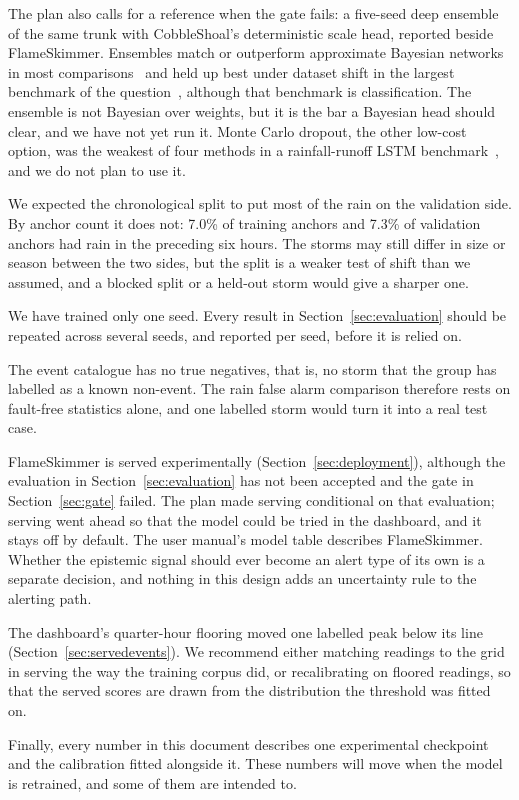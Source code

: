 \documentclass{article}
\begin{document}
The plan also calls for a reference when the gate fails: a five-seed deep
ensemble of the same trunk with CobbleShoal's deterministic scale head,
reported beside FlameSkimmer. Ensembles match or outperform approximate
Bayesian networks in most comparisons~\citep{lakshminarayanan2017ensembles}
and held up best under dataset shift in the largest benchmark of the
question~\citep{ovadia2019shift}, although that benchmark is classification.
The ensemble is not Bayesian over weights, but it is the bar a Bayesian head
should clear, and we have not yet run it. Monte Carlo dropout, the other
low-cost option, was the weakest of four methods in a rainfall-runoff LSTM
benchmark~\citep{klotz2022rainfall}, and we do not plan to use it.

We expected the chronological split to put most of the rain on the validation
side. By anchor count it does not: 7.0\% of training anchors and 7.3\% of
validation anchors had rain in the preceding six hours. The storms may still
differ in size or season between the two sides, but the split is a weaker test
of shift than we assumed, and a blocked split or a held-out storm would give a
sharper one.

We have trained only one seed. Every result in Section~\ref{sec:evaluation}
should be repeated across several seeds, and reported per seed, before it is
relied on.

The event catalogue has no true negatives, that is, no storm that the group has
labelled as a known non-event. The rain false alarm comparison therefore rests
on fault-free statistics alone, and one labelled storm would turn it into a
real test case.

FlameSkimmer is served experimentally (Section~\ref{sec:deployment}),
although the evaluation in Section~\ref{sec:evaluation} has not been accepted
and the gate in Section~\ref{sec:gate} failed. The plan made serving
conditional on that evaluation; serving went ahead so that the model could be
tried in the dashboard, and it stays off by default. The user manual's model
table describes FlameSkimmer.
Whether the epistemic signal should ever become an alert type of its own is a
separate decision, and nothing in this design adds an uncertainty rule to the
alerting path.

The dashboard's quarter-hour flooring moved one labelled peak below its line
(Section~\ref{sec:servedevents}). We recommend either matching readings to the
grid in serving the way the training corpus did, or recalibrating on floored
readings, so that the served scores are drawn from the distribution the
threshold was fitted on.

Finally, every number in this document describes one experimental checkpoint
and the calibration fitted alongside it. These numbers will move when the model
is retrained, and some of them are intended to.



\end{document}
